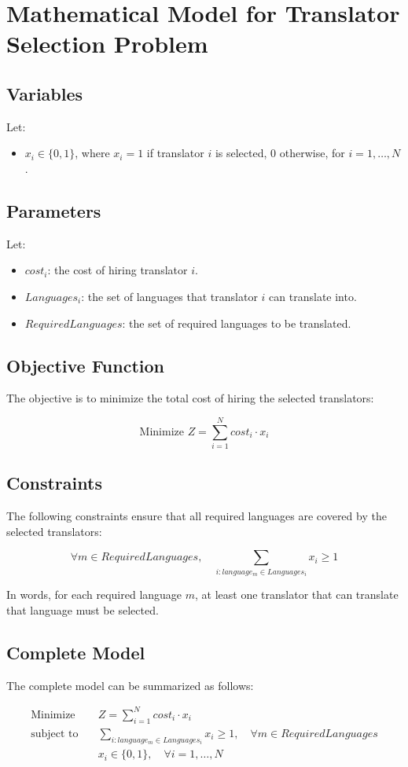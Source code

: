 \documentclass{article}
\begin{document}
\section*{Mathematical Model for Translator Selection Problem}

\subsection*{Variables}
Let:
\begin{itemize}
    \item $x_i \in \{0, 1\}$, where $x_i = 1$ if translator $i$ is selected, $0$ otherwise, for $i = 1, \ldots, N$.
\end{itemize}

\subsection*{Parameters}
Let:
\begin{itemize}
    \item $cost_i$: the cost of hiring translator $i$.
    \item $Languages_i$: the set of languages that translator $i$ can translate into.
    \item $RequiredLanguages$: the set of required languages to be translated.
\end{itemize}

\subsection*{Objective Function}
The objective is to minimize the total cost of hiring the selected translators:

\[
\text{Minimize } Z = \sum_{i=1}^{N} cost_i \cdot x_i
\]

\subsection*{Constraints}
The following constraints ensure that all required languages are covered by the selected translators:

\[
\forall m \in RequiredLanguages, \quad \sum_{i: language_m \in Languages_i} x_i \geq 1
\]

In words, for each required language $m$, at least one translator that can translate that language must be selected.

\subsection*{Complete Model}
The complete model can be summarized as follows:

\begin{align*}
\text{Minimize} & \quad Z = \sum_{i=1}^{N} cost_i \cdot x_i \\
\text{subject to} & \quad \sum_{i: language_m \in Languages_i} x_i \geq 1, \quad \forall m \in RequiredLanguages \\
& \quad x_i \in \{0, 1\}, \quad \forall i = 1, \ldots, N
\end{align*}
\end{document}
